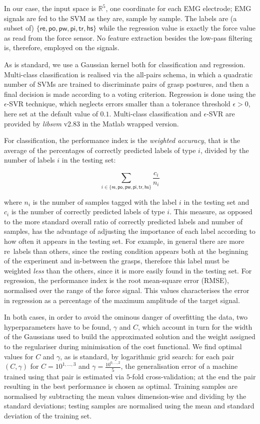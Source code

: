 \documentclass[review,authoryear]{elsarticle}
\def\RR{\mathbb{R}}
\def\re{\textsf{re}}
\def\po{\textsf{po}}
\def\pw{\textsf{pw}}
\def\pi{\textsf{pi}}
\def\tr{\textsf{tr}}
\def\hs{\textsf{hs}}
\renewcommand{\cite}{\citep}
\begin{document}
In our case, the input space is $\RR^5$, one coordinate for each EMG
electrode; EMG signals are fed to the SVM as they are, sample by sample. The labels are
(a subset of) $\{\re,\po,\pw,\pi,\tr,\hs\}$ while the regression value is exactly the
force value as read from the force sensor. No feature extraction besides the low-pass
filtering is, therefore, employed on the signals.

As is standard, we use a Gaussian kernel both for classification and regression.
Multi-class classification is realised via the all-pairs schema,
in which a quadratic number of SVMs are trained to discriminate pairs of grasp
postures, and then a final decision is made according to a voting criterion.
Regression is done using the $\epsilon$-SVR technique, which neglects errors smaller
than a tolerance threshold $\epsilon>0$, here set at the default value of $0.1$.
Multi-class classification and $\epsilon$-SVR are
provided by \emph{libsvm} v2.83 \cite{ChangL01} in the Matlab wrapped version.

For classification, the performance index is the \emph{weighted accuracy},
that is the average of the percentages of correctly predicted labels of type
$i$, divided by the number of labels $i$ in the testing set:

$$ \sum_{i \in \{\re,\po,\pw,\pi,\tr,\hs\}}	\frac{c_i}{n_i} $$

\noindent where $n_i$ is the number of samples tagged with the label $i$
in the testing set and $c_i$ is the number of correctly predicted labels of type $i$.
This measure, as opposed to the more standard overall ratio of correctly
predicted labels and number of samples, has the advantage of adjusting the
importance of each label according to how often it appears in the
testing set. For example, in general there are more \re\ labels than others,
since the resting condition appears both at the beginning
of the experiment and in-between the grasps, therefore this label must be
weighted \emph{less} than the others, since it is more easily found in the testing
set. For regression, the performance index is the root mean-square error (RMSE),
normalised over the range of the force signal. This values characterises
the error in regression as a percentage of the maximum amplitude of the target
signal.

In both cases, in order to avoid the ominous danger of overfitting the data,
two hyperparameters have to be found, $\gamma$ and $C$,
which account in turn for the width of the Gaussians used to build the
approximated solution and the weight assigned to the regulariser during minimisation of
the cost functional.
We find optimal values for $C$ and $\gamma$, as is standard, by logarithmic grid search:
for each pair $(C,\gamma)$ for $C=10^{1,\ldots,3}$ and $\gamma=\frac{10^{0,\ldots,2}}{5}$,
the generalisation error of a machine trained using that pair is estimated
via $5$-fold cross-validation; at the end the pair resulting in the best performance is
chosen as optimal. Training samples are normalised by subtracting the mean values
dimension-wise and dividing by the standard deviations; testing samples are normalised
using the mean and standard deviation of the training set.
\end{document}
